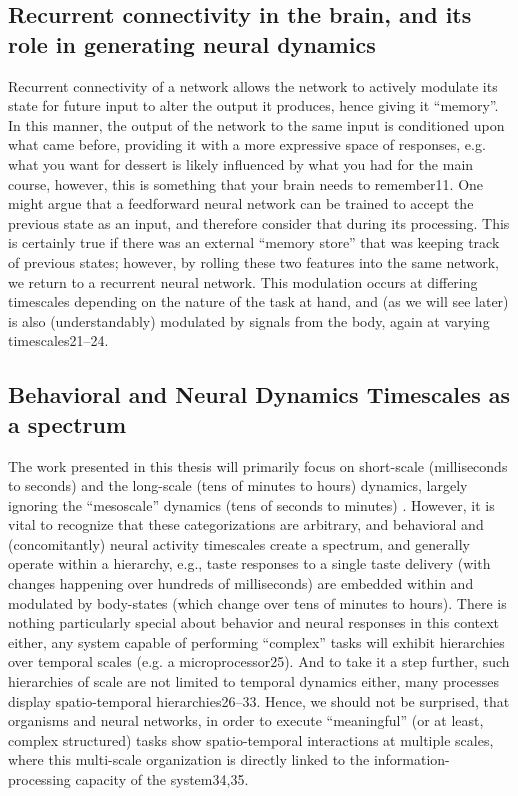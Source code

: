 \begin{refsection}
\section{Recurrent connectivity in the brain, and its role in generating neural dynamics}
Recurrent connectivity of a network allows the network to actively modulate its state for future input to alter the output it produces, hence giving it “memory”. In this manner, the output of the network to the same input is conditioned upon what came before, providing it with a more expressive space of responses, e.g. what you want for dessert is likely influenced by what you had for the main course, however, this is something that your brain needs to remember11. One might argue that a feedforward neural network can be trained to accept the previous state as an input, and therefore consider that during its processing. This is certainly true if there was an external “memory store” that was keeping track of previous states; however, by rolling these two features into the same network, we return to a recurrent neural network. This modulation occurs at differing timescales depending on the nature of the task at hand, and (as we will see later) is also (understandably) modulated by signals from the body, again at varying timescales21–24.

\subsection{Behavioral and Neural Dynamics Timescales as a spectrum}
The work presented in this thesis will primarily focus on short-scale (milliseconds to seconds) and the long-scale (tens of minutes to hours) dynamics, largely ignoring the “mesoscale” dynamics (tens of seconds to minutes) . However, it is vital to recognize that these categorizations are arbitrary, and behavioral and (concomitantly) neural activity timescales create a spectrum, and generally operate within a hierarchy, e.g., taste responses to a single taste delivery (with changes happening over hundreds of milliseconds) are embedded within and modulated by body-states (which change over tens of minutes to hours). There is nothing particularly special about behavior and neural responses in this context either, any system capable of performing “complex” tasks will exhibit hierarchies over temporal scales (e.g. a microprocessor25). And to take it a step further, such hierarchies of scale are not limited to temporal dynamics either, many processes display spatio-temporal hierarchies26–33. Hence, we should not be surprised, that organisms and neural networks, in order to execute “meaningful” (or at least, complex structured) tasks show spatio-temporal interactions at multiple scales, where this multi-scale organization is directly linked to the information-processing capacity of the system34,35.  


\end{refsection}
